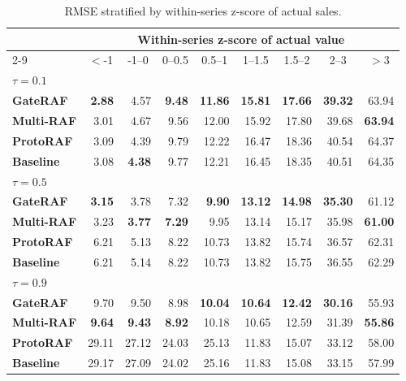 \begin{table}[t]
    \caption{RMSE stratified by within-series z-score of actual sales.}
    \label{tab:rmse_vs_zscore}
    \centering
    \begin{tabular}{lrrrrrrrr}
    \hline
    & \multicolumn{8}{c}{Within-series z-score of actual value} \\
    \cline{2-9}
    \multicolumn{1}{c}{Model} & \multicolumn{1}{c}{$<$-1} & \multicolumn{1}{c}{-1--0} & \multicolumn{1}{c}{0--0.5} & \multicolumn{1}{c}{0.5--1} & \multicolumn{1}{c}{1--1.5} & \multicolumn{1}{c}{1.5--2} & \multicolumn{1}{c}{2--3} & \multicolumn{1}{c}{$>$3} \\
    \hline\hline
    \multicolumn{9}{l}{$\tau=0.1$} \\
    \quad \textbf{GateRAF} & \textbf{2.88} & 4.57 & \textbf{9.48} & \textbf{11.86} & \textbf{15.81} & \textbf{17.66} & \textbf{39.32} & 63.94 \\
    \quad \textbf{Multi-RAF} & 3.01 & 4.67 & 9.56 & 12.00 & 15.92 & 17.80 & 39.68 & \textbf{63.94} \\
    \quad \textbf{ProtoRAF} & 3.09 & 4.39 & 9.79 & 12.22 & 16.47 & 18.36 & 40.54 & 64.37 \\
    \quad \textbf{Baseline} & 3.08 & \textbf{4.38} & 9.77 & 12.21 & 16.45 & 18.35 & 40.51 & 64.35 \\
    \hline
    \multicolumn{9}{l}{$\tau=0.5$} \\
    \quad \textbf{GateRAF} & \textbf{3.15} & 3.78 & 7.32 & \textbf{9.90} & \textbf{13.12} & \textbf{14.98} & \textbf{35.30} & 61.12 \\
    \quad \textbf{Multi-RAF} & 3.23 & \textbf{3.77} & \textbf{7.29} & 9.95 & 13.14 & 15.17 & 35.98 & \textbf{61.00} \\
    \quad \textbf{ProtoRAF} & 6.21 & 5.13 & 8.22 & 10.73 & 13.82 & 15.74 & 36.57 & 62.31 \\
    \quad \textbf{Baseline} & 6.21 & 5.14 & 8.22 & 10.73 & 13.82 & 15.75 & 36.55 & 62.29 \\
    \hline
    \multicolumn{9}{l}{$\tau=0.9$} \\
    \quad \textbf{GateRAF} & 9.70 & 9.50 & 8.98 & \textbf{10.04} & \textbf{10.64} & \textbf{12.42} & \textbf{30.16} & 55.93 \\
    \quad \textbf{Multi-RAF} & \textbf{9.64} & \textbf{9.43} & \textbf{8.92} & 10.18 & 10.65 & 12.59 & 31.39 & \textbf{55.86} \\
    \quad \textbf{ProtoRAF} & 29.11 & 27.12 & 24.03 & 25.13 & 11.83 & 15.07 & 33.12 & 58.00 \\
    \quad \textbf{Baseline} & 29.17 & 27.09 & 24.02 & 25.16 & 11.83 & 15.08 & 33.15 & 57.99 \\
    \hline
    \end{tabular}
\end{table}
